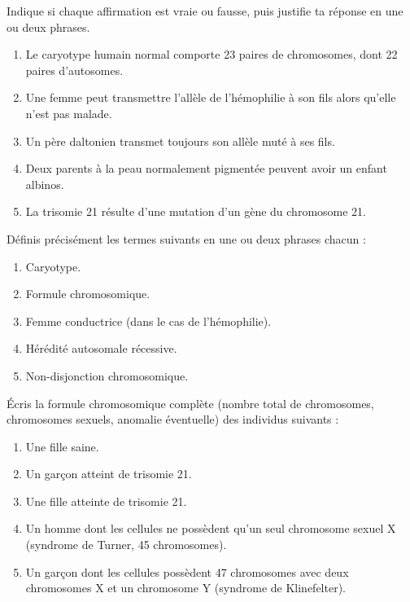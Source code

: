 \documentclass[11pt]{article}
\begin{document}
\begin{exercice}
Indique si chaque affirmation est vraie ou fausse, puis justifie ta réponse en une ou deux phrases.
\begin{enumerate}
\item Le caryotype humain normal comporte 23 paires de chromosomes, dont 22 paires d'autosomes.
\item Une femme peut transmettre l'allèle de l'hémophilie à son fils alors qu'elle n'est pas malade.
\item Un père daltonien transmet toujours son allèle muté à ses fils.
\item Deux parents à la peau normalement pigmentée peuvent avoir un enfant albinos.
\item La trisomie 21 résulte d'une mutation d'un gène du chromosome 21.
\end{enumerate}
\end{exercice}

\begin{exercice}
Définis précisément les termes suivants en une ou deux phrases chacun :
\begin{enumerate}
\item Caryotype.
\item Formule chromosomique.
\item Femme conductrice (dans le cas de l'hémophilie).
\item Hérédité autosomale récessive.
\item Non-disjonction chromosomique.
\end{enumerate}
\end{exercice}

\begin{exercice}
Écris la formule chromosomique complète (nombre total de chromosomes, chromosomes sexuels, anomalie éventuelle) des individus suivants :
\begin{enumerate}
\item Une fille saine.
\item Un garçon atteint de trisomie 21.
\item Une fille atteinte de trisomie 21.
\item Un homme dont les cellules ne possèdent qu'un seul chromosome sexuel X (syndrome de Turner, 45 chromosomes).
\item Un garçon dont les cellules possèdent 47 chromosomes avec deux chromosomes X et un chromosome Y (syndrome de Klinefelter).
\end{enumerate}
\end{exercice}
\end{document}
